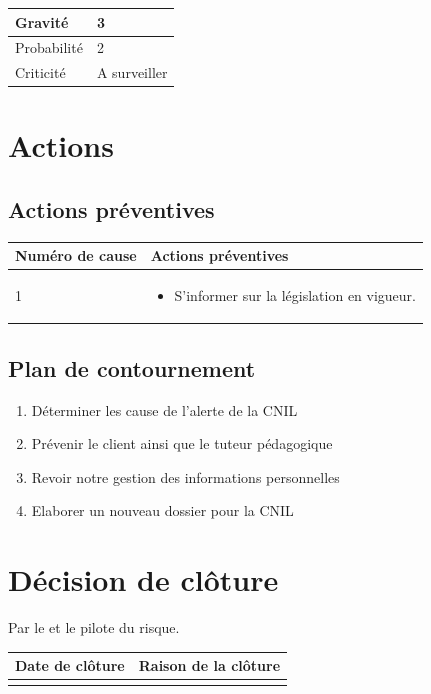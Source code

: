 \documentclass[11pt]{article}
\begin{document}
\begin{table}[h]
\centering
	\begin{tabularx}{12.8cm}{|>{}X|X|}
	\hline
	Gravité & 3\\
	\hline
	Probabilité & 2\\
	\hline
	Criticité & A surveiller\\
	\hline
	\end{tabularx}
\end{table}
\newpage

\section*{Actions}
\subsection*{Actions préventives}

\centering
	\begin{longtable}{|p{7cm}|p{7cm}|}
	\hline
	Numéro de cause & Actions préventives \\
	\hline
	 1 & \begin{itemize}
	 	\item S'informer sur la législation en vigueur.
	 \end{itemize} \\
	\hline

	\end{longtable}

\flushleft
\subsection*{Plan de contournement}

\begin{enumerate}
	\item Déterminer les cause de l'alerte de la CNIL
	\item Prévenir le client ainsi que le tuteur pédagogique
	\item Revoir notre gestion des informations personnelles
	\item Elaborer un nouveau dossier pour la CNIL
\end{enumerate}

\section*{Décision de clôture}
Par le \CP{} et le pilote du risque.
\begin{table}[H]
\centering
	\begin{tabularx}{12.8cm}{|X|X|}
	\hline
	Date de clôture & Raison de la clôture \\
	\hline
	  & \\
	\hline
	\end{tabularx}
\end{table}
\end{document}
